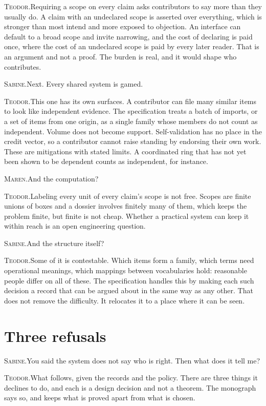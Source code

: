 \documentclass[11pt]{article}
\newcommand{\say}[2]{\par\noindent\textsc{#1.}\enspace #2\par}
\newcommand{\MA}[1]{\say{Maren}{#1}}
\newcommand{\TE}[1]{\say{Teodor}{#1}}
\newcommand{\SA}[1]{\say{Sabine}{#1}}
\begin{document}
\TE{Requiring a scope on every claim asks contributors to say more than they usually do. A claim with an undeclared scope is asserted over everything, which is stronger than most intend and more exposed to objection. An interface can default to a broad scope and invite narrowing, and the cost of declaring is paid once, where the cost of an undeclared scope is paid by every later reader. That is an argument and not a proof. The burden is real, and it would shape who contributes.}

\SA{Next. Every shared system is gamed.}

\TE{This one has its own surfaces. A contributor can file many similar items to look like independent evidence. The specification treats a batch of imports, or a set of items from one origin, as a single family whose members do not count as independent. Volume does not become support. Self-validation has no place in the credit vector, so a contributor cannot raise standing by endorsing their own work. These are mitigations with stated limits. A coordinated ring that has not yet been shown to be dependent counts as independent, for instance.}

\MA{And the computation?}

\TE{Labeling every unit of every claim's scope is not free. Scopes are finite unions of boxes and a dossier involves finitely many of them, which keeps the problem finite, but finite is not cheap. Whether a practical system can keep it within reach is an open engineering question.}

\SA{And the structure itself?}

\TE{Some of it is contestable. Which items form a family, which terms need operational meanings, which mappings between vocabularies hold: reasonable people differ on all of these. The specification handles this by making each such decision a record that can be argued about in the same way as any other. That does not remove the difficulty. It relocates it to a place where it can be seen.}

\section{Three refusals}

\SA{You said the system does not say who is right. Then what does it tell me?}

\TE{What follows, given the records and the policy. There are three things it declines to do, and each is a design decision and not a theorem. The monograph says so, and keeps what is proved apart from what is chosen.}
\end{document}
